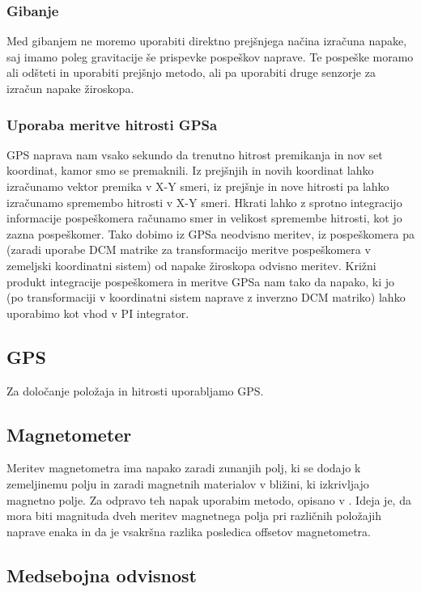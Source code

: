 \documentclass[]{article}
\begin{document}
\subsubsection{Gibanje}
Med gibanjem ne moremo uporabiti direktno prejšnjega načina izračuna napake, saj imamo poleg gravitacije še prispevke pospeškov naprave. Te pospeške moramo ali odšteti in uporabiti prejšnjo metodo, ali pa uporabiti druge senzorje za izračun napake žiroskopa.
\subsubsection{Uporaba meritve hitrosti GPSa}
GPS naprava nam vsako sekundo da trenutno hitrost premikanja in nov set koordinat, kamor smo se premaknili. Iz prejšnjih in novih koordinat lahko izračunamo vektor premika v X-Y smeri, iz prejšnje in nove hitrosti pa lahko izračunamo spremembo hitrosti v X-Y smeri. 
Hkrati lahko z sprotno integracijo informacije pospeškomera računamo smer in velikost spremembe hitrosti, kot jo zazna pospeškomer. Tako dobimo iz GPSa neodvisno meritev, iz pospeškomera pa (zaradi uporabe DCM matrike za transformacijo meritve pospeškomera v zemeljski koordinatni sistem) od napake žiroskopa odvisno meritev. Križni produkt integracije pospeškomera in meritve GPSa nam tako da napako, ki jo (po transformaciji v koordinatni sistem naprave z inverzno DCM matriko) lahko uporabimo kot vhod v PI integrator.

\subsection{GPS}
Za določanje položaja in hitrosti uporabljamo GPS.

\subsection{Magnetometer}
Meritev magnetometra ima napako zaradi zunanjih polj, ki se dodajo k zemeljinemu polju in zaradi magnetnih materialov v bližini, ki izkrivljajo magnetno polje.
Za odpravo teh napak uporabim metodo, opisano v \cite{Magnetometer Offset Cancellation: Theory and Implementation, revisited}.
Ideja je, da mora biti magnituda dveh meritev magnetnega polja pri različnih položajih naprave enaka in da je vsakršna razlika posledica offsetov magnetometra.

\subsection{Medsebojna odvisnost}
\end{document}
